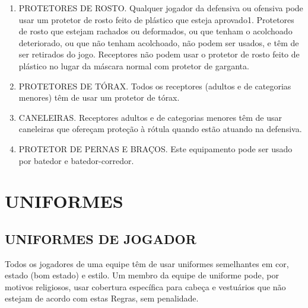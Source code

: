  \begin{enumerate}
	\item  PROTETORES DE ROSTO. Qualquer jogador da defensiva ou ofensiva pode usar um protetor de rosto feito de plástico que esteja aprovado1. Protetores de rosto que estejam rachados ou deformados, ou que tenham o acolchoado deteriorado, ou que não tenham acolchoado, não podem ser usados, e têm de ser retirados do jogo. Receptores não podem usar o protetor de rosto feito de plástico no lugar da máscara normal com protetor de garganta.
	\item  PROTETORES DE TÓRAX. Todos os receptores (adultos e de categorias menores) têm de usar um protetor de tórax.
	\item  CANELEIRAS. Receptores adultos e de categorias menores têm de usar caneleiras que ofereçam proteção à rótula quando estão atuando na defensiva.
	\item  PROTETOR DE PERNAS E BRAÇOS. Este equipamento pode ser usado por batedor e batedor-corredor.
 \end{enumerate}

\section{UNIFORMES}
\subsection{UNIFORMES DE JOGADOR}
Todos os jogadores de uma equipe têm de usar uniformes semelhantes em cor, estado (bom estado) e estilo. Um membro da equipe de uniforme pode, por motivos religiosos, usar cobertura específica para cabeça e vestuários que não estejam de acordo com estas Regras, sem penalidade.

